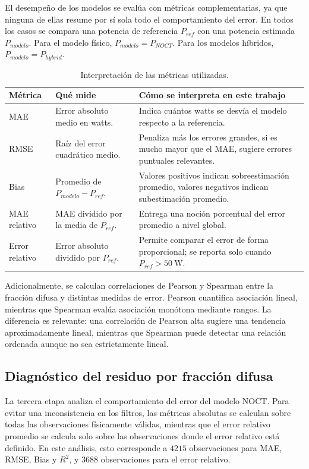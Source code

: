 \documentclass[12pt, letterpaper]{article}
\begin{document}
El desempeño de los modelos se evalúa con métricas complementarias, ya que ninguna de ellas resume por sí sola todo el comportamiento del error. En todos los casos se compara una potencia de referencia \(P_{ref}\) con una potencia estimada \(P_{modelo}\). Para el modelo físico, \(P_{modelo}=P_{NOCT}\). Para los modelos híbridos, \(P_{modelo}=P_{hybrid}\).

\begin{table}[H]
\centering
\caption{Interpretaci\'on de las m\'etricas utilizadas.}
\label{tab:interpretacion_metricas}
\small
\begin{tabularx}{\textwidth}{lXX}
\toprule
\textbf{M\'etrica} & \textbf{Qu\'e mide} & \textbf{C\'omo se interpreta en este trabajo} \\
\midrule
MAE & Error absoluto medio en watts. & Indica cu\'antos watts se desv\'ia el modelo respecto a la referencia. \\
RMSE & Raíz del error cuadrático medio. & Penaliza más los errores grandes, si es mucho mayor que el MAE, sugiere errores puntuales relevantes. \\
Bias & Promedio de \(P_{modelo}-P_{ref}\). & Valores positivos indican sobreestimación promedio, valores negativos indican subestimación promedio. \\
MAE relativo & MAE dividido por la media de \(P_{ref}\). & Entrega una noción porcentual del error promedio a nivel global. \\
Error relativo & Error absoluto dividido por \(P_{ref}\). & Permite comparar el error de forma proporcional; se reporta solo cuando \(P_{ref}>\SI{50}{\watt}\). \\
\bottomrule
\end{tabularx}
\end{table}

Adicionalmente, se calculan correlaciones de Pearson y Spearman entre la fracci\'on difusa y distintas medidas de error. Pearson cuantifica asociaci\'on lineal, mientras que Spearman eval\'ua asociaci\'on mon\'otona mediante rangos. La diferencia es relevante: una correlaci\'on de Pearson alta sugiere una tendencia aproximadamente lineal, mientras que Spearman puede detectar una relaci\'on ordenada aunque no sea estrictamente lineal.

\subsection{Diagn\'ostico del residuo por fracci\'on difusa}

La tercera etapa analiza el comportamiento del error del modelo NOCT. Para evitar una inconsistencia en los filtros, las m\'etricas absolutas se calculan sobre todas las observaciones f\'isicamente v\'alidas, mientras que el error relativo promedio se calcula solo sobre las observaciones donde el error relativo est\'a definido. En este an\'alisis, esto corresponde a \(4215\) observaciones para MAE, RMSE, Bias y \(R^2\), y \(3688\) observaciones para el error relativo.
\end{document}

